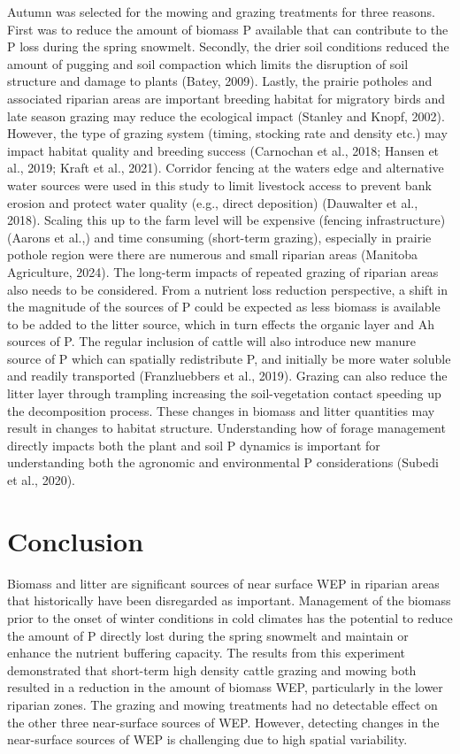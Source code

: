 \documentclass[
]{agujournal2019}
\begin{document}
Autumn was selected for the mowing and grazing treatments for three
reasons. First was to reduce the amount of biomass P available that can
contribute to the P loss during the spring snowmelt. Secondly, the drier
soil conditions reduced the amount of pugging and soil compaction which
limits the disruption of soil structure and damage to plants (Batey,
2009). Lastly, the prairie potholes and associated riparian areas are
important breeding habitat for migratory birds and late season grazing
may reduce the ecological impact (Stanley and Knopf, 2002). However, the
type of grazing system (timing, stocking rate and density etc.) may
impact habitat quality and breeding success (Carnochan et al., 2018;
Hansen et al., 2019; Kraft et al., 2021). Corridor fencing at the waters
edge and alternative water sources were used in this study to limit
livestock access to prevent bank erosion and protect water quality
(e.g., direct deposition) (Dauwalter et al., 2018). Scaling this up to
the farm level will be expensive (fencing infrastructure) (Aarons et
al.,) and time consuming (short-term grazing), especially in prairie
pothole region were there are numerous and small riparian areas
(Manitoba Agriculture, 2024). The long-term impacts of repeated grazing
of riparian areas also needs to be considered. From a nutrient loss
reduction perspective, a shift in the magnitude of the sources of P
could be expected as less biomass is available to be added to the litter
source, which in turn effects the organic layer and Ah sources of P. The
regular inclusion of cattle will also introduce new manure source of P
which can spatially redistribute P, and initially be more water soluble
and readily transported (Franzluebbers et al., 2019). Grazing can also
reduce the litter layer through trampling increasing the soil-vegetation
contact speeding up the decomposition process. These changes in biomass
and litter quantities may result in changes to habitat structure.
Understanding how of forage management directly impacts both the plant
and soil P dynamics is important for understanding both the agronomic
and environmental P considerations (Subedi et al., 2020).

\section{Conclusion}\label{conclusion}

Biomass and litter are significant sources of near surface WEP in
riparian areas that historically have been disregarded as important.
Management of the biomass prior to the onset of winter conditions in
cold climates has the potential to reduce the amount of P directly lost
during the spring snowmelt and maintain or enhance the nutrient
buffering capacity. The results from this experiment demonstrated that
short-term high density cattle grazing and mowing both resulted in a
reduction in the amount of biomass WEP, particularly in the lower
riparian zones. The grazing and mowing treatments had no detectable
effect on the other three near-surface sources of WEP. However,
detecting changes in the near-surface sources of WEP is challenging due
to high spatial variability.
\end{document}

